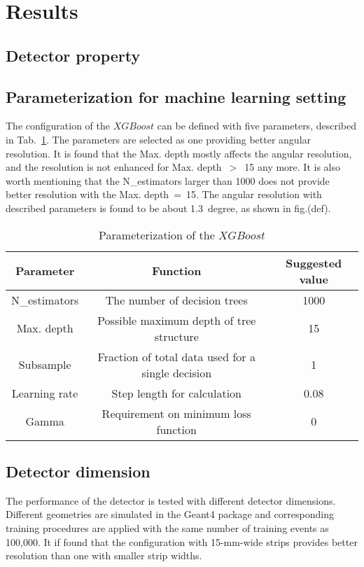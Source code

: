 \documentclass[jkps,preprint,fleqn,showpacs,showkeys]{revtex4}
\newcommand{\XGB}{XGBoost}
\begin{document}

\section{Results}
\label{sec:res}

\subsection{Detector property}

\subsection{Parameterization for machine learning setting}
The configuration of the $\XGB$ can be defined with five parameters, described in Tab.~\ref{tab:XgbPar}. The parameters are selected as one providing better angular resolution. It is found that the Max. depth mostly affects the angular resolution, and the resolution is not enhanced for Max. depth~$>$~15 any more. It is also worth mentioning that the N\_estimators larger than 1000 does not provide better resolution with the Max. depth~=~15. The angular resolution with described parameters is found to be about 1.3~degree, as shown in fig.(def).

\begin{table}[hbt!]
\centering
\caption{Parameterization of the $\XGB$}
\begin{tabular}{ccc}
\hline 
Parameter & Function & Suggested value \\ \hline 
N\_estimators & The number of decision trees & 1000 \\  
Max. depth & Possible maximum depth of tree structure & 15 \\ 
Subsample & Fraction of total data used for a single decision & 1 \\ 
Learning rate & Step length for calculation & 0.08 \\ 
Gamma & Requirement on minimum loss function & 0 \\ 
\hline
\end{tabular}
\label{tab:XgbPar}
\end{table}

\subsection{Detector dimension}
The performance of the detector is tested with different detector dimensions. Different geometries are simulated in the Geant4 package and corresponding training procedures are applied with the same number of training events as 100,000. It if found that the configuration with 15-mm-wide strips provides better resolution than one with smaller strip widths. 
\end{document}
